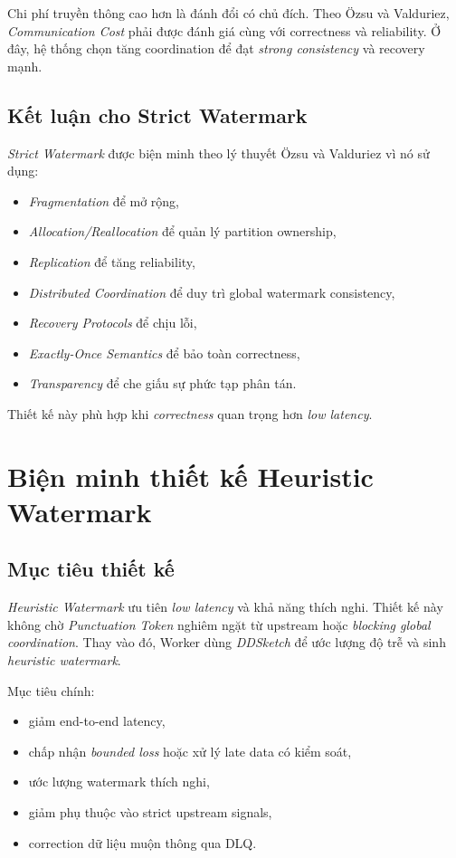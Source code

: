 \documentclass[12pt,a4paper]{article}
\begin{document}
Chi phí truyền thông cao hơn là đánh đổi có chủ đích. Theo Özsu và Valduriez, \textit{Communication Cost} phải được đánh giá cùng với correctness và reliability. Ở đây, hệ thống chọn tăng coordination để đạt \textit{strong consistency} và recovery mạnh.

\subsection{Kết luận cho Strict Watermark}

\textit{Strict Watermark} được biện minh theo lý thuyết Özsu và Valduriez vì nó sử dụng:

\begin{itemize}
    \item \textit{Fragmentation} để mở rộng,
    \item \textit{Allocation/Reallocation} để quản lý partition ownership,
    \item \textit{Replication} để tăng reliability,
    \item \textit{Distributed Coordination} để duy trì global watermark consistency,
    \item \textit{Recovery Protocols} để chịu lỗi,
    \item \textit{Exactly-Once Semantics} để bảo toàn correctness,
    \item \textit{Transparency} để che giấu sự phức tạp phân tán.
\end{itemize}

Thiết kế này phù hợp khi \textit{correctness} quan trọng hơn \textit{low latency}.

\section{Biện minh thiết kế Heuristic Watermark}

\subsection{Mục tiêu thiết kế}

\textit{Heuristic Watermark} ưu tiên \textit{low latency} và khả năng thích nghi. Thiết kế này không chờ \textit{Punctuation Token} nghiêm ngặt từ upstream hoặc \textit{blocking global coordination}. Thay vào đó, Worker dùng \textit{DDSketch} để ước lượng độ trễ và sinh \textit{heuristic watermark}.

Mục tiêu chính:

\begin{itemize}
    \item giảm end-to-end latency,
    \item chấp nhận \textit{bounded loss} hoặc xử lý late data có kiểm soát,
    \item ước lượng watermark thích nghi,
    \item giảm phụ thuộc vào strict upstream signals,
    \item correction dữ liệu muộn thông qua DLQ.
\end{itemize}
\end{document}
